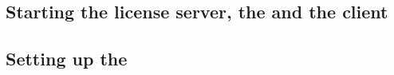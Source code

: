 \subsection{Starting the license server, the \gdagent and the client}


\subsection{Setting up the \gdproject{}}
\label{tutorialsetup}

